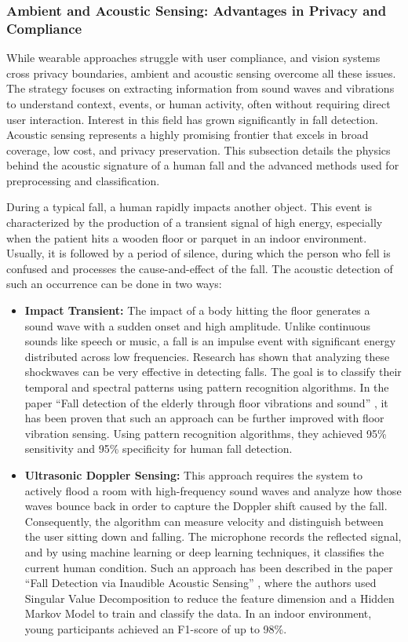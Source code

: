 \documentclass[11pt, a4paper, twoside]{article}
\begin{document}
\subsubsection{Ambient and Acoustic Sensing: Advantages in Privacy and Compliance}

While wearable approaches struggle with user compliance, and vision systems cross privacy boundaries, ambient and acoustic sensing overcome all these issues. The strategy focuses on extracting information from sound waves and vibrations to understand context, events, or human activity, often without requiring direct user interaction. Interest in this field has grown significantly in fall detection. Acoustic sensing represents a highly promising frontier that excels in broad coverage, low cost, and privacy preservation. This subsection details the physics behind the acoustic signature of a human fall and the advanced methods used for preprocessing and classification.

During a typical fall, a human rapidly impacts another object. This event is characterized by the production of a transient signal of high energy, especially when the patient hits a wooden floor or parquet in an indoor environment. Usually, it is followed by a period of silence, during which the person who fell is confused and processes the cause-and-effect of the fall. The acoustic detection of such an occurrence can be done in two ways:

\begin{itemize}
    \item \textbf{Impact Transient:} The impact of a body hitting the floor generates a sound wave with a sudden onset and high amplitude. Unlike continuous sounds like speech or music, a fall is an impulse event with significant energy distributed across low frequencies. Research has shown that analyzing these shockwaves can be very effective in detecting falls. The goal is to classify their temporal and spectral patterns using pattern recognition algorithms. In the paper ``Fall detection of the elderly through floor vibrations and sound'' \cite{litvak2008fall}, it has been proven that such an approach can be further improved with floor vibration sensing. Using pattern recognition algorithms, they achieved 95\% sensitivity and 95\% specificity for human fall detection.
    \item \textbf{Ultrasonic Doppler Sensing:} This approach requires the system to actively flood a room with high-frequency sound waves and analyze how those waves bounce back in order to capture the Doppler shift caused by the fall. Consequently, the algorithm can measure velocity and distinguish between the user sitting down and falling. The microphone records the reflected signal, and by using machine learning or deep learning techniques, it classifies the current human condition. Such an approach has been described in the paper ``Fall Detection via Inaudible Acoustic Sensing'' \cite{lian2021fall}, where the authors used Singular Value Decomposition to reduce the feature dimension and a Hidden Markov Model to train and classify the data. In an indoor environment, young participants achieved an F1-score of up to 98\%.
\end{itemize}
\end{document}
